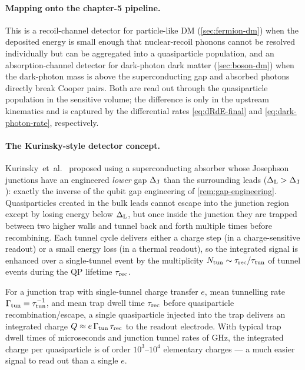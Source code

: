 \paragraph{Mapping onto the chapter-5 pipeline.}
This is a recoil-channel detector for particle-like DM
(\cref{sec:fermion-dm}) when the deposited energy is small enough
that nuclear-recoil phonons cannot be resolved individually but
can be aggregated into a quasiparticle population, and an
absorption-channel detector for dark-photon dark matter
(\cref{sec:boson-dm}) when the dark-photon mass is above the
superconducting gap and absorbed photons directly break Cooper
pairs.  Both are read out through the quasiparticle population
in the sensitive volume; the difference is only in the upstream
kinematics and is captured by the differential rates
\cref{eq:dRdE-final} and \cref{eq:dark-photon-rate}, respectively.

\paragraph{The Kurinsky-style detector concept.}
Kurinsky~et~al.~\cite{kurinsky2020} proposed using a
superconducting absorber whose Josephson junctions have an
engineered \emph{lower} gap $\Delta_{\rm J}$ than the surrounding
leads ($\Delta_{\rm L} > \Delta_{\rm J}$): exactly the inverse of
the qubit gap engineering of \cref{rem:gap-engineering}.
Quasiparticles created in the bulk leads cannot escape into the
junction region except by losing energy below $\Delta_{\rm L}$,
but once inside the junction they are trapped between two higher
walls and tunnel back and forth multiple times before recombining.
Each tunnel cycle delivers either a charge step (in a
charge-sensitive readout) or a small energy loss (in a thermal
readout), so the integrated signal is enhanced over a single-tunnel
event by the multiplicity
$N_{\rm tun}\sim\tau_{\rm rec}/\tau_{\rm tun}$ of tunnel events
during the QP lifetime $\tau_{\rm rec}$.

\begin{statement}
\label{stmt:multi-tunnel}
For a junction trap with single-tunnel charge transfer $e$, mean
tunnelling rate $\Gamma_{\rm tun}=\tau_{\rm tun}^{-1}$, and mean
trap dwell time $\tau_{\rm rec}$ before quasiparticle
recombination/escape, a single quasiparticle injected into the
trap delivers an integrated charge
$Q\approx e\,\Gamma_{\rm tun}\,\tau_{\rm rec}$ to the readout
electrode. With typical trap dwell times of microseconds and
junction tunnel rates of GHz, the integrated charge per
quasiparticle is of order $10^3$--$10^4$ elementary charges ---
a much easier signal to read out than a single $e$.
\end{statement}

